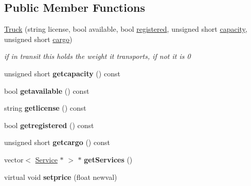 \subsection*{Public Member Functions}
\begin{DoxyCompactItemize}
\item 
\mbox{\label{class_truck_a310563b5c12feb94c1e1f8f855c1ee05}} 
\hyperlink{class_truck_a310563b5c12feb94c1e1f8f855c1ee05}{Truck} (string license, bool available, bool \hyperlink{class_truck_a80b8405cf7a15b236fef70116f99c4fb}{registered}, unsigned short \hyperlink{class_truck_a14541fad6d47c606ce4e1bd150a68a23}{capacity}, unsigned short \hyperlink{class_truck_a968fc6b1a6171a03e4254d6615da4ecd}{cargo})
\begin{DoxyCompactList}\small\item\em if in transit this holds the weight it transports, if not it is 0 \end{DoxyCompactList}\item 
\mbox{\label{class_truck_ad775a01ae4cb8c36d6e2438f4dd37792}} 
unsigned short {\bfseries getcapacity} () const
\item 
\mbox{\label{class_truck_a0eaa329bc72bf0171f7ec2a0a6240156}} 
bool {\bfseries getavailable} () const
\item 
\mbox{\label{class_truck_ae76a7ae2343557680ae915c6c6d42ff8}} 
string {\bfseries getlicense} () const
\item 
\mbox{\label{class_truck_a830838ed22465cf27f56b911c3fadf13}} 
bool {\bfseries getregistered} () const
\item 
\mbox{\label{class_truck_a1bc18daed6fb7f0b900dac32013a250f}} 
unsigned short {\bfseries getcargo} () const
\item 
\mbox{\label{class_truck_a207506f38e78d7a5f065893295a2c00d}} 
vector$<$ \hyperlink{class_service}{Service} $\ast$ $>$ $\ast$ {\bfseries get\+Services} ()
\item 
\mbox{\label{class_truck_a22d2dc22b1c5b9652d463ec624442403}} 
virtual void {\bfseries setprice} (float newval)
\item 
\mbox{\label{class_truck_a9268e17e1a967d1702b28c6940403aa4}} 

\end{DoxyCompactItemize}
